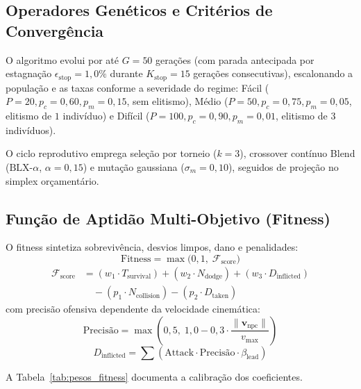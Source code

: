 \documentclass[10pt,conference,twocolumn]{article}
\begin{document}
\subsection{Operadores Genéticos e Critérios de Convergência}
O algoritmo evolui por até $G = 50$ gerações (com parada antecipada por estagnação $\epsilon_{\text{stop}} = 1{,}0\%$ durante $K_{\text{stop}} = 15$ gerações consecutivas), escalonando a população e as taxas conforme a severidade do regime: Fácil ($P = 20, p_c = 0{,}60, p_m = 0{,}15$, sem elitismo), Médio ($P = 50, p_c = 0{,}75, p_m = 0{,}05$, elitismo de $1$ indivíduo) e Difícil ($P = 100, p_c = 0{,}90, p_m = 0{,}01$, elitismo de $3$ indivíduos).

O ciclo reprodutivo emprega seleção por torneio ($k = 3$), crossover contínuo Blend ($\text{BLX-}\alpha$, $\alpha = 0{,}15$) e mutação gaussiana ($\sigma_m = 0{,}10$), seguidos de projeção no simplex orçamentário.

\subsection{Função de Aptidão Multi-Objetivo (Fitness)}
O fitness sintetiza sobrevivência, desvios limpos, dano e penalidades:
\begin{equation}
\text{Fitness} = \max\Big(0{,}1, \; \mathcal{F}_{\text{score}}\Big) \label{eq:fitness}
\end{equation}
\begin{align}
\mathcal{F}_{\text{score}} &= (w_1 \cdot T_{\text{survival}}) + (w_2 \cdot N_{\text{dodge}}) + (w_3 \cdot D_{\text{inflicted}}) \nonumber \\
&\quad - (p_1 \cdot N_{\text{collision}}) - (p_2 \cdot D_{\text{taken}}) \label{eq:fscore}
\end{align}
com precisão ofensiva dependente da velocidade cinemática:
\begin{equation}
\text{Precisão} = \max\left(0{,}5, \; 1{,}0 - 0{,}3 \cdot \frac{\|\mathbf{v}_{\text{npc}}\|}{v_{\text{max}}}\right)
\end{equation}
\begin{equation}
D_{\text{inflicted}} = \sum \left(\text{Attack} \cdot \text{Precisão} \cdot \beta_{\text{lead}}\right)
\end{equation}

A Tabela~\ref{tab:pesos_fitness} documenta a calibração dos coeficientes.
\end{document}
